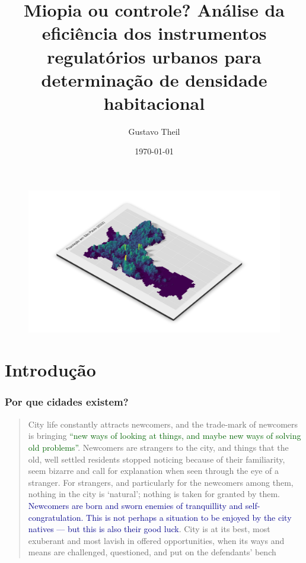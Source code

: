 \documentclass[%
    9pt, 
    aspectratio=169,
]{beamer}
\title{Miopia ou controle? Análise da eficiência dos instrumentos regulatórios urbanos para determinação de densidade habitacional}
\author{Gustavo Theil}
\date{\today}
\begin{document}
\begin{frame}[plain]{}
    \begin{figure}
        \includegraphics[width = \paperwidth, height = \paperheight]{imagens/mapa3d.png}
    \end{figure}
\end{frame}

\frame{\titlepage}


\section{Introdução}

\begin{frame}
    \frametitle{Por que cidades existem?}
    \begin{quote}
        City life constantly attracts newcomers, and the trade-mark of newcomers is bringing \textcolor{DarkGreen}{``new ways of looking at things, and maybe new ways of solving old problems''}. Newcomers are strangers to the city, and things that the old, well settled residents stopped noticing because of their familiarity, seem bizarre and call for explanation when seen through the eye of a stranger. For strangers, and particularly for the newcomers among them, nothing in the city is `natural'; nothing is taken for granted by them. \textcolor{DarkBlue}{Newcomers are born and sworn enemies of tranquillity and self-congratulation. This is not perhaps a situation to be enjoyed by the city natives --- but this is also their good luck}. City is at its best, most exuberant and most lavish in offered opportunities, when its ways and means are challenged, questioned, and put on the defendants' bench

    \end{quote}
\end{frame}
\end{document}
